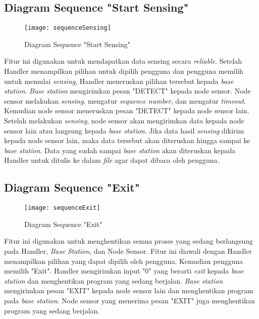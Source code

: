 \subsection{Diagram Sequence "Start Sensing"}
\begin{figure}[H]
	\centering
	\texttt{[image: sequenceSensing]}
	\caption{Diagram Sequence "Start Sensing"}
	\label{fig:sequenceSensing}
\end{figure}
Fitur ini digunakan untuk mendapatkan data sensing secara \textit{reliable}. Setelah Handler menampilkan pilihan untuk dipilih pengguna dan pengguna memilih untuk memulai \textit{sensing}, Handler meneruskan pilihan tersebut kepada \textit{base station}. \textit{Base station} mengirimkan pesan "DETECT" kepada node sensor. Node sensor melakukan \textit{sensing}, mengatur \textit{sequence number}, dan mengatur \textit{timeout}. Kemudian node sensor meneruskan pesan "DETECT" kepada node sensor lain. Setelah melakukan \textit{sensing}, node sensor akan mengirimkan data kepada node sensor lain atau langsung kepada \textit{base station}. Jika data hasil \textit{sensing} dikirim kepada node sensor lain, maka data tersebut akan diteruskan hingga sampai ke \textit{base station}. Data yang sudah sampai \textit{base station} akan diteruskan kepada Handler untuk ditulis ke dalam \textit{file} agar dapat dibaca oleh pengguna. 

\subsection{Diagram Sequence "Exit"}
\begin{figure}[H]
	\centering
	\texttt{[image: sequenceExit]}
	\caption{Diagram Sequence "Exit"}
	\label{fig:sequenceExit}
\end{figure}
Fitur ini digunakan untuk menghentikan semua proses yang sedang berlangsung pada Handler, \textit{Base Station}, dan Node Sensor. Fitur ini diawali dengan Handler menampilkan pilihan yang dapat dipilih oleh pengguna. Kemudian pengguna memilih "Exit". Handler mengirimkan input "0" yang berarti \textit{exit} kepada \textit{base station} dan menghentikan program yang sedang berjalan. \textit{Base station} mengirimkan pesan "EXIT" kepada node sensor lain dan menghentikan program pada \textit{base station}. Node sensor yang menerima pesan "EXIT" juga menghentikan program yang sedang berjalan.

